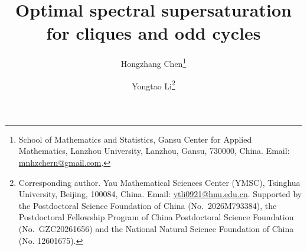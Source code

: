 \documentclass[11pt,a4paper]{article}
\theoremstyle{definition}
\theoremstyle{plain}
\begin{document}
\title{Optimal spectral supersaturation for cliques and odd cycles}


\author{Hongzhang Chen\thanks{School of Mathematics and Statistics, Gansu Center for Applied Mathematics, Lanzhou University, Lanzhou, Gansu, 730000, China. Email: \url{mnhzchern@gmail.com}.} 
\and Yongtao Li\thanks{Corresponding author. 
Yau Mathematical Sciences Center (YMSC), Tsinghua University, Beijing, 100084, China. Email: \url{ytli0921@hnu.edu.cn}.  Supported by the Postdoctoral Science Foundation of China (No.~2026M793384), the Postdoctoral Fellowship Program of China Postdoctoral Science Foundation (No.~GZC20261656) and the National Natural Science Foundation of China (No. 12601675).} 
}

\date{}

\maketitle

\vspace{-0.7cm}
\end{document}
